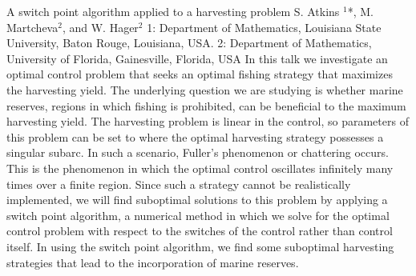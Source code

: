\begin{addmargin}[2em]{0em}
\vspace{1.5ex}
\abs
{A switch point algorithm applied to a harvesting problem}
{S. Atkins {$^{1}$*},  M. Martcheva{$^{2}$}, and W. Hager{$^{2}$}}
{1: Department of Mathematics, Louisiana State University, Baton Rouge, Louisiana, USA. 2: Department of Mathematics, University of Florida, Gainesville, Florida, USA}
{In this talk we investigate an optimal control problem that seeks an optimal fishing strategy that maximizes the harvesting yield. The underlying question we are studying is whether marine reserves, regions in which fishing is prohibited, can be beneficial to the maximum harvesting yield. The harvesting problem is linear in the control, so parameters of this problem can be set to where the optimal harvesting strategy possesses a singular subarc. In such a scenario, Fuller’s phenomenon or chattering occurs. This is the phenomenon in which the optimal control oscillates infinitely many times over a finite region. Since such a strategy cannot be realistically implemented, we will find suboptimal solutions to this problem by applying a switch point algorithm, a numerical method in which we solve for the optimal control problem with respect to the switches of the control rather than control itself. In using the switch point algorithm, we find some suboptimal harvesting strategies that lead to the incorporation of marine reserves.}

\end{addmargin}





